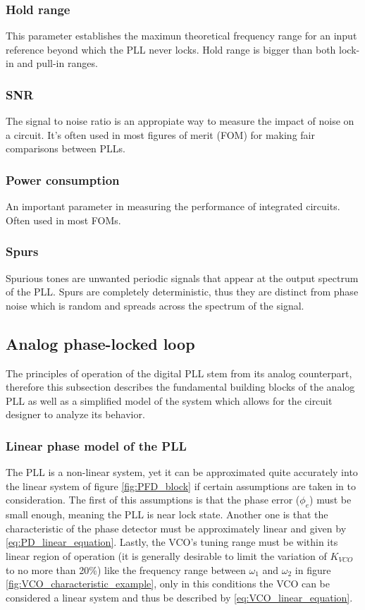 \subsubsection{Hold range}
This parameter establishes the maximun theoretical frequency range for an input reference beyond which the PLL never locks. Hold range
is bigger than both lock-in and pull-in ranges.
\subsubsection{SNR}
The signal to noise ratio is an appropiate way to measure the impact of noise on a circuit. It's often used in most figures
of merit (FOM) for making fair comparisons between PLLs.
\subsubsection{Power consumption}
An important parameter in measuring the performance of integrated circuits. Often used in most FOMs.
\subsubsection{Spurs}
Spurious tones are unwanted periodic signals that appear at the output spectrum of the PLL. Spurs are completely deterministic, thus they are distinct
from phase noise which is random and spreads across the spectrum of the signal.

\subsection{Analog phase-locked loop}
The principles of operation of the digital PLL stem from its analog counterpart, therefore this subsection describes the fundamental 
building blocks of the analog PLL as well as a simplified model of the system which allows for the circuit designer to analyze its behavior.

\subsubsection{Linear phase model of the PLL}
The PLL is a non-linear system, yet it can be approximated quite accurately into the linear system of figure \ref{fig:PFD_block} if certain
assumptions are taken in to consideration. The first of this assumptions is that the phase error ($\phi_{e}$) must be small enough, 
meaning the PLL is near lock state. Another one is that the characteristic of the phase detector must be approximately linear and given
by \eqref{eq:PD_linear_equation}. Lastly, the VCO's tuning range must be within its linear region of operation (it is generally desirable to limit the
variation of $K_{VCO}$ to no more than 20\%) like the frequency range between $\omega_1$ and $\omega_2$ in figure \ref{fig:VCO_characteristic_example}, only in this conditions the VCO can be considered
a linear system and thus be described by \eqref{eq:VCO_linear_equation}.  

